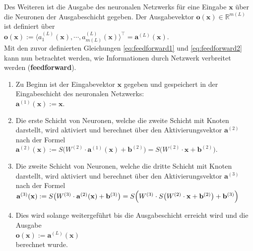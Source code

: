 Des Weiteren ist die Ausgabe des neuronalen Netzwerks für eine Eingabe $\mathbf{x}$ über die Neuronen der Ausgabeschicht gegeben. Der Ausgabevektor $\mathbf{o}(\mathbf{x}) \in \mathbb{R}^{m(L)}$ ist definiert über
\\[0.2cm]
\hspace*{1.3cm}
$\mathbf{o}(\mathbf{x}) := \langle a^{(L)}_1(\mathbf{x}), \cdots, a^{(L)}_{m(L)}(\mathbf{x}) \rangle^\top = \mathbf{a}^{(L)}(\mathbf{x})$.
\\[0.2cm]
Mit den zuvor definierten Gleichungen \ref{eq:feedforward1} und \ref{eq:feedforward2} kann nun betrachtet werden, wie Informationen durch Netzwerk verbreitet werden (\textbf{feedforward}).
\begin{enumerate}
\item Zu Beginn ist der Eingabevektor $\mathbf{x}$ gegeben und gespeichert in der Eingabeschicht des neuronalen Netzwerks: 
      \\[0.2cm]
      \hspace*{1.3cm}
      $\mathbf{a}^{(1)}(\mathbf{x}) := \mathbf{x}$.
\item Die erste Schicht von Neuronen, welche die zweite Schicht mit Knoten darstellt, wird aktiviert und berechnet über den Aktivierungsvektor $\mathbf{a}^{(2)}$ nach der Formel
      \\[0.2cm]
      \hspace*{1.3cm}
      $\mathbf{a}^{(2)}(\mathbf{x}) := S\bigl(W^{(2)} \cdot \mathbf{a}^{(1)}(\mathbf{x}) + \mathbf{b}^{(2)}\bigr) = 
                                        S\bigl(W^{(2)} \cdot \mathbf{x} + \mathbf{b}^{(2)}\bigr)
      $.
\item Die zweite Schicht von Neuronen, welche die dritte Schicht mit Knoten darstellt, wird aktiviert und berechnet über den Aktivierungsvektor $\mathbf{a}^{(3)}$ nach der Formel
      \\[0.2cm]
      \hspace*{1.3cm}
      $\mathbf{a}^{(3)}(\mathbf{x}) := S\bigl(W^{(3)} \cdot \mathbf{a}^{(2)}(\mathbf{x}) + \mathbf{b}^{(3)}\bigr)
                          = S\Bigl(W^{(3)} \cdot S\bigl(W^{(2)} \cdot \mathbf{x} + \mathbf{b}^{(2)}\bigr) + \mathbf{b}^{(3)}\Bigr)
        $
\item Dies wird solange weitergeführt bis die Ausgabeschicht erreicht wird und die Ausgabe
      \\[0.2cm]
      \hspace*{1.3cm}
      $\mathbf{o}(\mathbf{x}) := \mathbf{a}^{(L)}(\mathbf{x})$
      \\[0.2cm]
      berechnet wurde. 
\end{enumerate}
